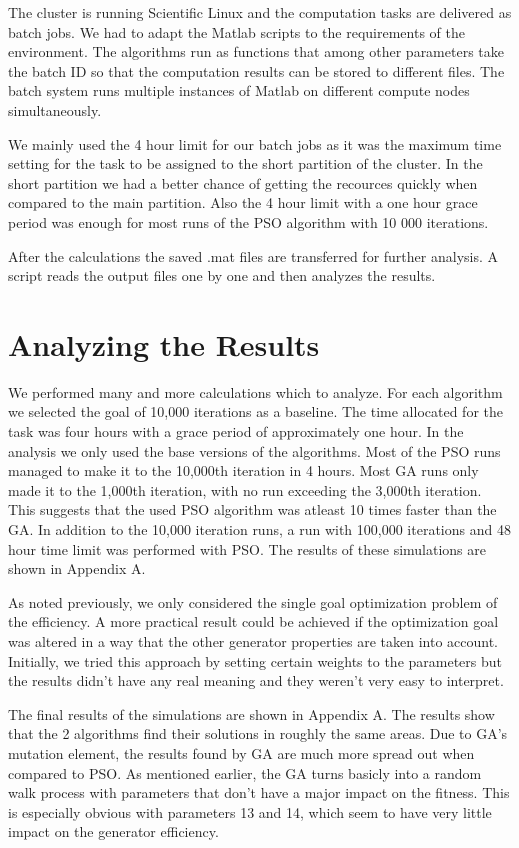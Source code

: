 \documentclass[twoside]{article}
\begin{document}
\begin{multicols}{2}
	The cluster is running Scientific Linux and the computation tasks are delivered as batch jobs. We had to adapt the Matlab scripts to the requirements of the environment. The algorithms run as functions that among other parameters take the batch ID so that the computation results can be stored to different files. The batch system runs multiple instances of Matlab on different compute nodes simultaneously. 
	
		We mainly used the 4 hour limit for our batch jobs as it was the maximum time setting for the task to be assigned to the short partition of the cluster. In the short partition we had a better chance of getting the recources quickly when compared to the main partition. Also the 4 hour limit with a one hour grace period was enough for most runs of the PSO algorithm with 10 000 iterations.
	
	After the calculations the saved .mat files are transferred for further analysis. A script reads the output files one by one and then analyzes the results.
	
	
	
\section{Analyzing the Results}
We performed many and more calculations which to analyze. For each algorithm we selected the goal of 10,000 iterations as a baseline. The time allocated for the task was four hours with a grace period of approximately one hour. In the analysis we only used the base versions of the algorithms. Most of the PSO runs managed to make it to the 10,000th iteration in 4 hours. Most GA runs only made it to the 1,000th iteration, with no run exceeding the 3,000th iteration. This suggests that the used PSO algorithm was atleast 10 times faster than the GA. In addition to the 10,000 iteration runs, a run with 100,000 iterations and 48 hour time limit was performed with PSO. The results of these simulations are shown in Appendix A.

As noted previously, we only considered the single goal optimization problem of the efficiency. A more practical result could be achieved if the optimization goal was altered in a way that the other generator properties are taken into account. Initially, we tried this approach by setting certain weights to the parameters but the results didn't have any real meaning and they weren't very easy to interpret. 

The final results of the simulations are shown in Appendix A. The results show that the 2 algorithms find their solutions in roughly the same areas. Due to GA's mutation element, the results found by GA are much more spread out when compared to PSO. As mentioned earlier, the GA turns basicly into a random walk process with parameters that don't have a major impact on the fitness. This is especially obvious with parameters 13 and 14, which seem to have very little impact on the generator efficiency.


\end{multicols}
\end{document}
